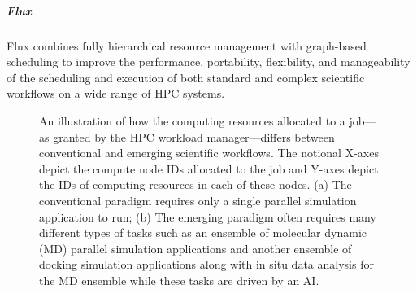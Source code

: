 \subparagraph{Flux}
Flux combines fully hierarchical resource management
with graph-based scheduling to improve
the performance, portability, flexibility,
and manageability of the scheduling
and execution of both standard and
complex scientific workflows on a wide range of HPC systems.
\begin{figure}[ht]
  \hfill
 \caption{An illustration of how the computing resources allocated
to a job---as granted by the HPC workload manager---differs between
conventional and emerging scientific workflows. The notional X-axes
depict the compute node IDs allocated to the job and Y-axes depict
the IDs of computing resources in each of these nodes. (a) The conventional paradigm
requires only a single parallel simulation application to run; (b) The emerging paradigm often requires many different types of tasks such as an ensemble of molecular dynamic (MD) parallel simulation applications and another ensemble of docking simulation applications along with in situ data analysis for the MD ensemble while these tasks are driven by an AI.}
 \label{fig:layout}
 \end{figure}
